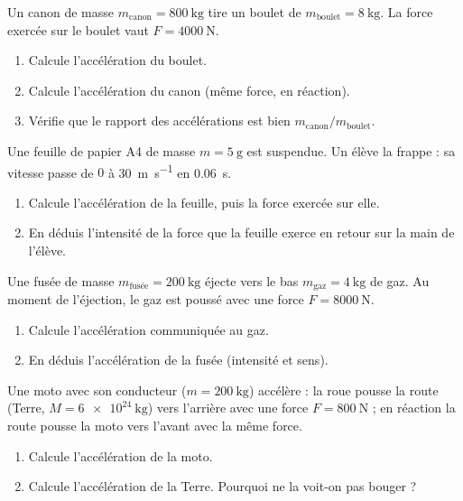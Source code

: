 \documentclass[11pt,a4paper]{article}
\begin{document}

\begin{exo}
Un canon de masse $m_{\text{canon}}=\qty{800}{\kilogram}$ tire un boulet de
$m_{\text{boulet}}=\qty{8}{\kilogram}$. La force exercée sur le boulet vaut $F=\qty{4000}{\newton}$.
\begin{enumerate}[label=\alph*)]
  \item Calcule l'accélération du boulet.
  \item Calcule l'accélération du canon (même force, en réaction).
  \item Vérifie que le rapport des accélérations est bien $m_{\text{canon}}/m_{\text{boulet}}$.
\end{enumerate}
\end{exo}

\begin{exo}
Une feuille de papier A4 de masse $m=\qty{5}{\gram}$ est suspendue. Un élève la frappe : sa vitesse
passe de $0$ à \qty{30}{\metre\per\second} en \qty{0,06}{\second}.
\begin{enumerate}[label=\alph*)]
  \item Calcule l'accélération de la feuille, puis la force exercée sur elle.
  \item En déduis l'intensité de la force que la feuille exerce en retour sur la main de l'élève.
\end{enumerate}
\end{exo}

\begin{exo}
Une fusée de masse $m_{\text{fusée}}=\qty{200}{\kilogram}$ éjecte vers le bas $m_{\text{gaz}}=\qty{4}{\kilogram}$
de gaz. Au moment de l'éjection, le gaz est poussé avec une force $F=\qty{8000}{\newton}$.
\begin{enumerate}[label=\alph*)]
  \item Calcule l'accélération communiquée au gaz.
  \item En déduis l'accélération de la fusée (intensité et sens).
\end{enumerate}
\end{exo}

\begin{exo}
Une moto avec son conducteur ($m=\qty{200}{\kilogram}$) accélère : la roue pousse la route (Terre,
$M=\qty{6e24}{\kilogram}$) vers l'arrière avec une force $F=\qty{800}{\newton}$ ; en réaction la route
pousse la moto vers l'avant avec la même force.
\begin{enumerate}[label=\alph*)]
  \item Calcule l'accélération de la moto.
  \item Calcule l'accélération de la Terre. Pourquoi ne la voit-on pas bouger ?
\end{enumerate}
\end{exo}
\end{document}
